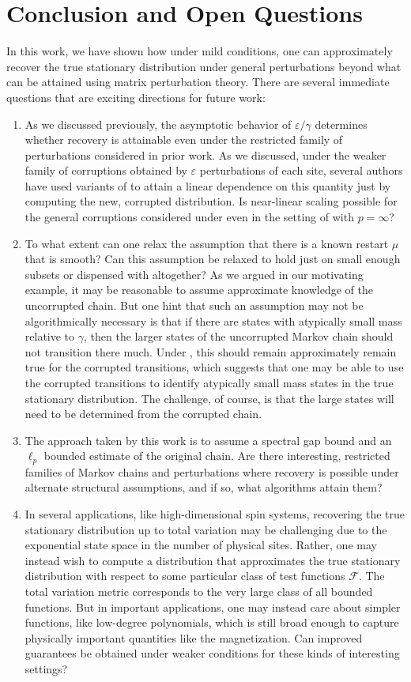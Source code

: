 \documentclass[11pt]{article}
\theoremstyle{remark}
\begin{document}
\section{Conclusion and Open Questions}
In this work, we have shown how under mild conditions, one can approximately recover the true stationary distribution under general perturbations beyond what can be attained using matrix perturbation theory. There are several immediate questions that are exciting directions for future work: 
\begin{enumerate}
    \item As we discussed previously, the  asymptotic behavior of $\varepsilon/\gamma$ determines whether recovery is attainable even under the restricted family of perturbations considered in prior work. As we discussed, under the weaker family of corruptions obtained by $\varepsilon$ perturbations of each site, several authors have used variants of  to attain a linear dependence on this quantity just by computing the new, corrupted distribution. 
    Is near-linear scaling possible for the general corruptions considered under  even in the setting of  with $p=\infty$?
    \item To what extent can one relax the assumption that there is a known restart $\mu$ that is smooth? Can this assumption be relaxed to hold just on small enough subsets or dispensed with altogether? As we argued in our motivating example, it may be reasonable to assume approximate knowledge of the uncorrupted chain. But one hint that such an assumption may not be algorithmically necessary is that if there are states with atypically small mass relative to $\gamma$, then the larger states of the uncorrupted Markov chain should not transition there much. Under , this should remain approximately remain true for the corrupted transitions, which suggests that one may be able to use the corrupted transitions to identify atypically small mass states in the true stationary distribution. The challenge, of course, is that the large states will need to be determined from the corrupted chain.
    \item The approach taken by this work is to assume a spectral gap bound and an $\ell_p$ bounded estimate of the original chain. Are there interesting, restricted families of Markov chains and perturbations where recovery is possible under alternate structural assumptions, and if so, what algorithms attain them? 
    \item In several applications, like high-dimensional spin systems, recovering the true stationary distribution up to total variation may be challenging due to the exponential state space in the number of physical sites. Rather, one may instead wish to compute a distribution that approximates the true stationary distribution with respect to some particular class of test functions $\mathcal{F}$. The total variation metric corresponds to the very large class of all bounded functions. But in important applications, one may instead care about simpler functions, like low-degree polynomials, which is still broad enough to capture physically important quantities like the magnetization. Can improved guarantees be obtained under weaker conditions for these kinds of interesting settings?
\end{enumerate}



\end{document}
